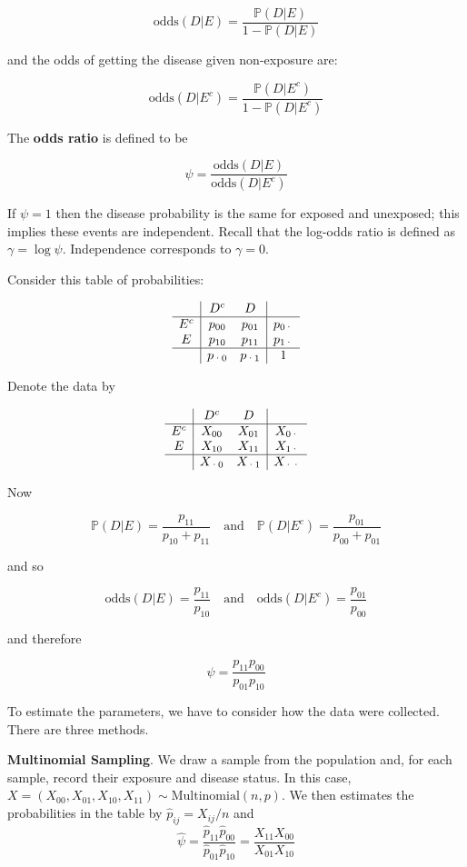 \[\text{odds}(D | E) = \frac{\mathbb{P}(D | E)}{1 - \mathbb{P}(D | E)}\]

and the odds of getting the disease given non-exposure are:

\[\text{odds}(D | E^{c}) = \frac{\mathbb{P}(D | E^{c})}{1 - \mathbb{P}(D | E^{c})}\]

The \textbf{odds ratio} is defined to be

\[\psi = \frac{\text{odds}(D | E)}{\text{odds}(D | E^{c})}\]

If \(\psi = 1\) then the disease probability is the same for exposed and
unexposed; this implies these events are independent. Recall that the
log-odds ratio is defined as \(\gamma = \log \psi\). Independence
corresponds to \(\gamma = 0\).

Consider this table of probabilities:

\[
\begin{array}{c|cc|c} 
      & D^{c}    & D      & \\
\hline
E^{c}   & p_{00} & p_{01} & p_{0\text{·}}\\
E     & p_{10} & p_{11} & p_{1\text{·}}\\
 \hline
      & p_{\text{·}0} & p_{\text{·}1} & 1
\end{array}
\]

Denote the data by

\[
\begin{array}{c|cc|c} 
      & D^{c}    & D      & \\
\hline
E^{c}   & X_{00} & X_{01} & X_{0\text{·}}\\
E     & X_{10} & X_{11} & X_{1\text{·}}\\
 \hline
      & X_{\text{·}0} & X_{\text{·}1} & X_{\text{··}}
\end{array}
\]

Now

\[
\mathbb{P}(D | E) = \frac{p_{11}}{p_{10} + p_{11}}
\quad \text{and} \quad
\mathbb{P}(D | E^{c}) = \frac{p_{01}}{p_{00} + p_{01}}
\]

and so

\[
\text{odds}(D | E) = \frac{p_{11}}{p_{10}}
\quad \text{and} \quad
\text{odds}(D | E^{c}) = \frac{p_{01}}{p_{00}}
\]

and therefore

\[ \psi = \frac{p_{11}p_{00}}{p_{01}p_{10}}\]

To estimate the parameters, we have to consider how the data were
collected. There are three methods.

\textbf{Multinomial Sampling}. We draw a sample from the population and, for each sample, record their exposure and disease status. In this case, 
\(X = (X_{00}, X_{01}, X_{10}, X_{11}) \sim \text{Multinomial}(n, p)\). 
We then estimates the probabilities in the table by 
\(\hat{p}_{ij} = X_{ij} / n\) and
\[
\hat{\psi} = \frac{\hat{p}_{11} \hat{p}_{00}}{\hat{p}_{01} \hat{p}_{10}} = \frac{X_{11} X_{00}}{X_{01} X_{10}}
\]


